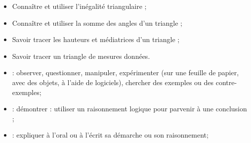 \begin{myobj}
	\begin{itemize}
		
		\item Connaître et utiliser l’inégalité triangulaire ; 
		\item Connaître et utiliser la somme des angles d’un triangle ;
		\item Savoir tracer les hauteurs et médiatrices d’un triangle ;
		\item Savoir tracer un triangle de mesures données.
	\end{itemize}
\end{myobj}

\begin{mycomp}
	\begin{itemize}
		\item {} :  observer, questionner, manipuler, expérimenter (sur une feuille de papier, avec des objets, à l’aide de logiciels), chercher des exemples ou des contre-exemples;
		\item {} :  démontrer : utiliser un raisonnement logique pour parvenir à une conclusion ;
		\item {} :  expliquer à l’oral ou à l’écrit sa démarche ou son raisonnement; 
		
	\end{itemize}
\end{mycomp}


